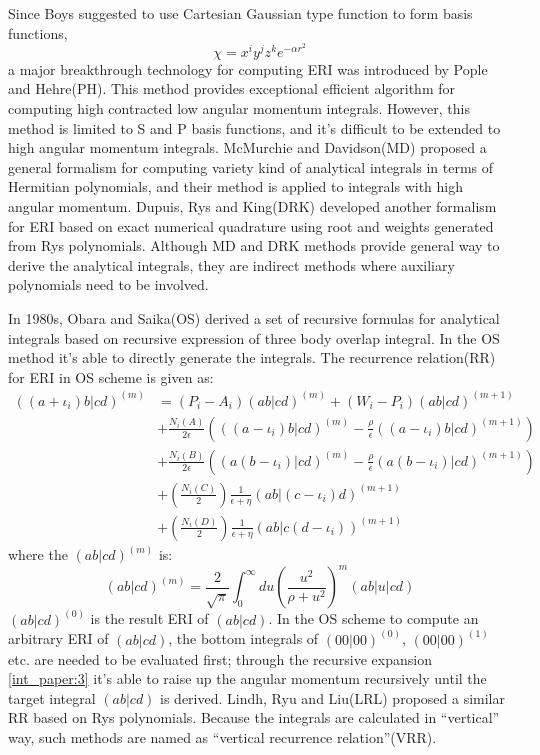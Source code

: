Since Boys\cite{SFBoys1950} suggested to use Cartesian Gaussian type function to form 
basis functions,
\begin{equation}\label{int_paper:2}
 \chi = x^{i}y^{j}z^{k}e^{-\alpha r^{2}}
\end{equation}
a major breakthrough technology for computing ERI was introduced by Pople and Hehre(PH)\cite{PH}. 
This method provides exceptional efficient algorithm for computing high contracted 
low angular momentum integrals. However, this method is limited to S and P basis functions, 
and it's difficult to be extended to high angular momentum integrals. McMurchie and Davidson(MD)\cite{MD}
proposed a general formalism for computing variety kind of analytical integrals in terms of 
Hermitian polynomials, and their method is applied to integrals with high angular momentum. 
Dupuis, Rys and King(DRK)\cite{DRK1976JCOMP,DRK1976JCP,DRK1983JCOMP} developed another formalism 
for ERI based on exact numerical 
quadrature using root and weights generated from Rys polynomials. Although MD and DRK
methods provide general way to derive the analytical integrals, they are indirect methods where
auxiliary polynomials need to be involved. 

In 1980s, Obara and Saika(OS)\cite{OS1986,OS1988} derived a set of
recursive formulas for analytical integrals based on recursive expression of 
three body overlap integral. In the OS method it's able to directly generate the integrals. The 
recurrence relation(RR) for ERI in OS scheme is given as:
\begin{equation}
 \begin{split}
((a+\iota_{i})b|cd)^{(m)} &= (P_{i} - A_{i})(ab|cd)^{(m)} +
\left(W_{i} -P_{i}\right)(ab|cd)^{(m+1)} \\
&+\frac{N_{i}(A)}{2\epsilon}\left(((a-\iota_{i})b|cd)^{(m)}-\frac{\rho}{
\epsilon }((a-\iota_{i})b|cd)^{(m+1)}\right)  \\
&+\frac{N_{i}(B)}{2\epsilon}\left((a(b-\iota_{i})|cd)^{(m)}-\frac{\rho}{
\epsilon }(a(b-\iota_{i})|cd)^{(m+1)}\right)  \\
&+\left(\frac{N_{i}(C)}{2}\right)\frac{1}{\epsilon+\eta}
(ab|(c-\iota_{i})d)^{(m+1)} \\
&+\left(\frac{N_{i}(D)}{2}\right)\frac{1}{\epsilon+\eta}
(ab|c(d-\iota_{i}))^{(m+1)}
\end{split}
\label{int_paper:3}
\end{equation}
where the $(ab|cd)^{(m)}$ is:
\begin{equation}
\label{int_paper:4}
 (ab|cd)^{(m)} = \frac{2}{\sqrt{\pi}}\int^{\infty}_{0} du \left( \frac{u^{2}}
{\rho+u^{2}}\right)^{m}(ab|u|cd) 
\end{equation}
$(ab|cd)^{(0)}$ is the result ERI of $(ab|cd)$. In the OS scheme to compute an arbitrary ERI 
of $(ab|cd)$, the bottom integrals of $(00|00)^{(0)}$, $(00|00)^{(1)}$ etc. are needed 
to be evaluated first; through the recursive expansion \ref{int_paper:3} it's able to raise
up the angular momentum recursively until the target integral $(ab|cd)$ is derived. Lindh, 
Ryu and Liu\cite{lindh1991reduced}(LRL) proposed a similar RR based on Rys 
polynomials. Because the integrals are calculated in ``vertical'' way, 
such methods are named as ``vertical recurrence relation''(VRR).


